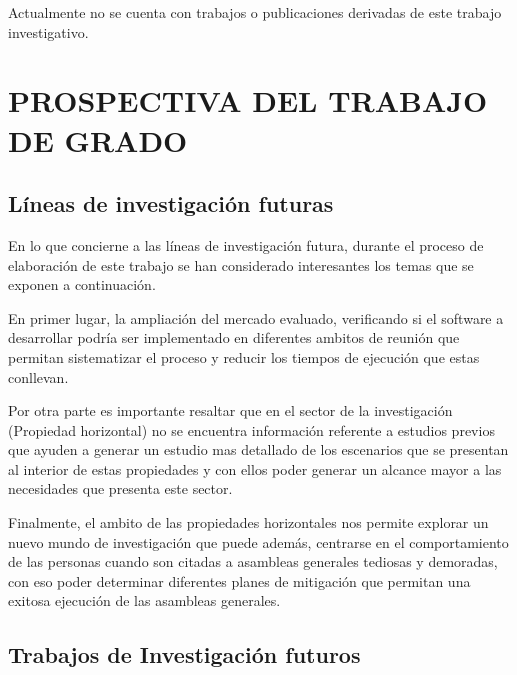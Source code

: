 Actualmente no se cuenta con trabajos o publicaciones derivadas de este trabajo investigativo.

\newpage


\chapter{PROSPECTIVA DEL TRABAJO DE GRADO}

\section{Líneas de investigación futuras}

En lo que concierne a las líneas de investigación futura, durante el proceso de
elaboración de este trabajo se han considerado interesantes los temas que se exponen a
continuación. 

\vspace{0.5cm}

En primer lugar, la ampliación del mercado evaluado, verificando si el software a desarrollar podría ser implementado en diferentes ambitos de reunión que permitan sistematizar el proceso y reducir los tiempos de ejecución que estas conllevan.

\vspace{0.5cm}

Por otra parte es importante resaltar que en el sector de la investigación (Propiedad horizontal) no se encuentra información referente a estudios previos que ayuden a generar un estudio mas detallado de los escenarios que se presentan al interior de estas propiedades y con ellos poder generar un alcance mayor a las necesidades que presenta este sector.

\vspace{0.5cm}

Finalmente, el ambito de las propiedades horizontales nos permite explorar un nuevo mundo de investigación que puede además, centrarse en el comportamiento de las personas cuando son citadas a asambleas generales tediosas y demoradas, con eso poder determinar diferentes planes de mitigación que permitan una exitosa ejecución de las asambleas generales. 

\vspace{0.5cm}

\section{Trabajos de Investigación futuros}

